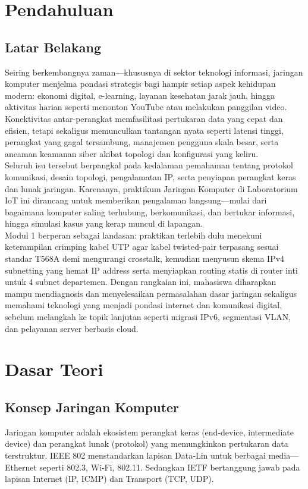 \section{Pendahuluan}
\subsection{Latar Belakang}
Seiring berkembangnya zaman—khususnya di sektor teknologi informasi, jaringan komputer menjelma pondasi strategis bagi hampir setiap aspek kehidupan modern: ekonomi digital, e-learning, layanan kesehatan jarak jauh, hingga aktivitas harian seperti menonton YouTube atau melakukan panggilan video. Konektivitas antar-perangkat memfasilitasi pertukaran data yang cepat dan efisien, tetapi sekaligus memunculkan tantangan nyata seperti latensi tinggi, perangkat yang gagal tersambung, manajemen pengguna skala besar, serta ancaman keamanan siber akibat topologi dan konfigurasi yang keliru. \\
Seluruh isu tersebut berpangkal pada kedalaman pemahaman tentang protokol komunikasi, desain topologi, pengalamatan IP, serta penyiapan perangkat keras dan lunak jaringan. Karenanya, praktikum Jaringan Komputer di Laboratorium IoT ini dirancang untuk memberikan pengalaman langsung—mulai dari bagaimana komputer saling terhubung, berkomunikasi, dan bertukar informasi, hingga simulasi kasus yang kerap muncul di lapangan. \\
Modul 1 berperan sebagai landasan: praktikan terlebih dulu menekuni keterampilan crimping kabel UTP agar kabel twisted-pair terpasang sesuai standar T568A demi mengurangi crosstalk, kemudian menyusun skema IPv4 subnetting yang hemat IP address serta menyiapkan routing statis di router inti untuk 4 subnet departemen. 
Dengan rangkaian ini, mahasiswa diharapkan mampu mendiagnosis dan menyelesaikan permasalahan dasar jaringan sekaligus memahami teknologi yang menjadi pondasi internet dan komunikasi digital, sebelum melangkah ke topik lanjutan seperti migrasi IPv6, segmentasi VLAN, dan pelayanan server berbasis cloud.


\section{Dasar Teori}
\subsection{Konsep Jaringan Komputer}
Jaringan komputer adalah ekosistem perangkat keras (end‑device, intermediate device) dan perangkat lunak (protokol) yang memungkinkan pertukaran data terstruktur. IEEE 802 menstandarkan lapisan Data‑Lin untuk berbagai media—Ethernet seperti 802.3, Wi‑Fi, 802.11. Sedangkan IETF bertanggung jawab pada lapisan Internet (IP, ICMP) dan Transport (TCP, UDP).

